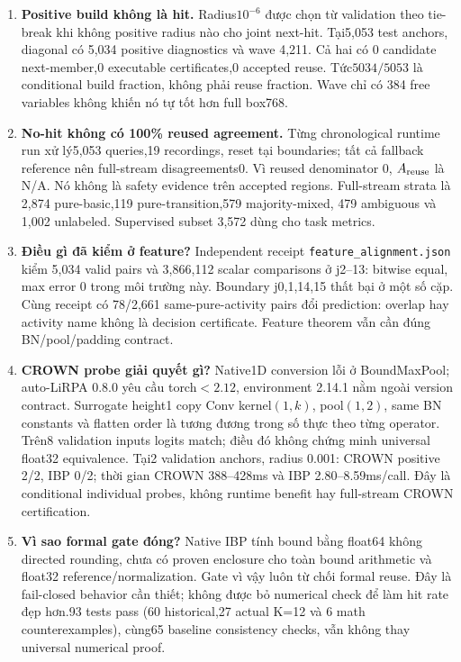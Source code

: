 \documentclass[11pt,a4paper]{article}
\newcommand{\code}[1]{{\small\ttfamily\nolinkurl{#1}}}
\theoremstyle{definition}
\begin{document}
\begin{enumerate}
\item \textbf{Positive build không là hit.} Radius$10^{-6}$ được chọn từ
validation theo tie-break khi không positive radius nào cho joint next-hit.
Tại5,053 test anchors, diagonal có 5,034 positive diagnostics và wave 4,211.
Cả hai có 0 candidate next-member,0 executable certificates,0 accepted reuse.
Tức$5034/5053$ là conditional build fraction, không phải reuse fraction.
Wave chỉ có 384 free variables không khiến nó tự tốt hơn full box768.
\item \textbf{No-hit không có 100\% reused agreement.} Từng chronological
runtime run xử lý5,053 queries,19 recordings, reset tại boundaries; tất cả
fallback reference nên full-stream disagreements0. Vì reused denominator 0,
$A_{\rm reuse}$ là N/A. Nó không là safety evidence trên accepted regions.
Full-stream strata là 2,874 pure-basic,119 pure-transition,579 majority-mixed,
479 ambiguous và 1,002 unlabeled. Supervised subset 3,572 dùng cho task metrics.
\item \textbf{Điều gì đã kiểm ở feature?} Independent receipt
\code{feature_alignment.json} kiểm 5,034 valid pairs và 3,866,112 scalar
comparisons ở j2--13: bitwise equal, max error 0 trong môi trường này.
Boundary j0,1,14,15 thất bại ở một số cặp. Cùng receipt có 78/2,661
same-pure-activity pairs đổi prediction: overlap hay activity name không
là decision certificate. Feature theorem vẫn cần đúng BN/pool/padding contract.
\item \textbf{CROWN probe giải quyết gì?} Native1D conversion lỗi ở
BoundMaxPool; auto-LiRPA 0.8.0 yêu cầu torch$<2.12$, environment 2.14.1
nằm ngoài version contract. Surrogate height1 copy Conv kernel$(1,k)$,
pool$(1,2)$, same BN constants và flatten order là tương đương trong số
thực theo từng operator. Trên8 validation inputs logits match; điều đó
không chứng minh universal float32 equivalence. Tại2 validation anchors,
radius 0.001: CROWN positive 2/2, IBP 0/2; thời gian CROWN 388--428ms và
IBP 2.80--8.59ms/call. Đây là conditional individual probes, không runtime
benefit hay full-stream CROWN certification.
\item \textbf{Vì sao formal gate đóng?} Native IBP tính bound bằng float64
không directed rounding, chưa có proven enclosure cho toàn bound arithmetic
và float32 reference/normalization. Gate vì vậy luôn từ chối formal reuse.
Đây là fail-closed behavior cần thiết; không được bỏ numerical check để
làm hit rate đẹp hơn.93 tests pass (60 historical,27 actual K=12 và 6
math counterexamples), cùng65 baseline consistency checks, vẫn không thay
universal numerical proof.
\end{enumerate}
\end{document}
